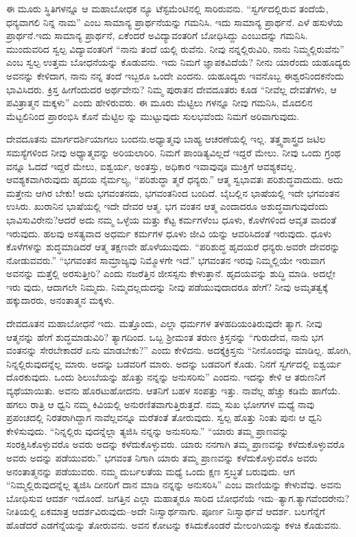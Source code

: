 ಈ ಮೂರು ಸ್ಥಿತಿಗಳನ್ನೂ ಆ ಮಹಾಬೋಧಕ ನ್ಯೂ ಟೆಸ್ಟಮೆಂಟಿನಲ್ಲಿ ಸಾರಿರುವನು. “ಸ್ವರ್ಗದಲ್ಲಿರುವ ತಂದೆಯೆ, ಧನ್ಯವಾಗಲಿ ನಿನ್ನ ನಾಮ” ಎಂಬ ಸಾಮಾನ್ಯ ಪ್ರಾರ್ಥನೆಯನ್ನು ಗಮನಿಸಿ. ಇದು ಸಾಮಾನ್ಯ ಪ್ರಾರ್ಥನೆ. ಎಳೆ ಹಸುಳೆಯ ಪ್ರಾರ್ಥನೆ.ಇದು ಸಾಮಾನ್ಯ ಪ್ರಾರ್ಥನೆ, ಏಕೆಂದರೆ ಅವಿದ್ಯಾವಂತರಿಗೆ ಬೋಧಿಸಿದ್ದು ಎಂಬುದನ್ನು ಗಮನಿಸಿ. ಮುಂದುವರಿದ ಸ್ವಲ್ಪ ವಿದ್ಯಾವಂತರಿಗೆ “ನಾನು ತಂದೆ ಯಲ್ಲಿ ರುವೆನು. ನೀವು ನನ್ನಲ್ಲಿರುವಿರಿ, ನಾನು ನಿಮ್ಮಲ್ಲಿರುವೆನು” ಎಂಬ ಸ್ವಲ್ಪ ಉತ್ತಮ ಬೋಧನೆಯನ್ನು ಕೊಡುವನು. ಇದು ನಿಮಗೆ ಜ್ಞಾಪಕವಿದೆಯೆ? ನೀನು ಯಾರೆಂದು ಯಹೂದ್ಯರು ಅವನನ್ನು ಕೇಳಿದಾಗ, ನಾನು ನನ್ನ ತಂದೆ ಇಬ್ಬರೂ ಒಂದೇ ಎಂದನು. ಯಹೂದ್ಯರು ಇವನೊಬ್ಬ ಈಶ್ವರನಿಂದಕನೆಂದು ಭಾವಿಸಿದರು. ಕ್ರಿಸ್ತ ಹೀಗೆಂದುದರ ಅರ್ಥವೇನು? ನಿಮ್ಮ ಪುರಾತನ ದೇವದೂತರು ಕೂಡ “ನೀವೆಲ್ಲ ದೇವತೆಗಳು, ಆ ಪವಿತ್ರಾತ್ಮನ ಮಕ್ಕಳು” ಎಂದು ಹೇಳಿರುವರು. ಈ ಮೂರು ಮೆಟ್ಟಿಲು ಗಳನ್ನೂ ನೀವು ಗಮನಿಸಿ, ಮೊದಲಿನ ಮೆಟ್ಟಲಿನಿಂದ ಪ್ರಾರಂಭಿಸಿ ಕೊನೆ ಮೆಟ್ಟಿಲ ನ್ನು ಮುಟ್ಟುವುದು ಸುಲಭವೆಂದು ನಿಮಗೆ ಅರಿವಾಗುವುದು.

ದೇವದೂತನು ಮಾರ್ಗದರ್ಶಿಯಾಗಲು ಬಂದನು.ಅಧ್ಯಾತ್ಮವು ಬಾಹ್ಯ ಆಚರಣೆಯಲ್ಲಿ ಇಲ್ಲ. ತತ್ತ್ವಶಾಸ್ತ್ರದ ಜಟಿಲ ಸಮಸ್ಯೆಗಳಿಂದ ನೀವು ಅಧ್ಯಾತ್ಮವನ್ನು ಅರಿಯಲಾರಿರಿ. ನಿಮಗೆ ಪಾಂಡಿತ್ಯವಿಲ್ಲದೆ ಇದ್ದರೆ ಮೇಲು. ನೀವು ಒಂದು ಗ್ರಂಥ ವನ್ನೂ ಓದದೆ ಇದ್ದರೆ ಮೇಲು, ಐಶ್ವರ್ಯ, ಅಂತಸ್ತು, ಅಧಿಕಾರ ಇವಾವುವೂ ಮುಕ್ತಿಗೆ ಆವಶ್ಯಕವಲ್ಲ. ಆವಶ್ಯಕವಾಗಿರುವುದು ಹೃದಯ ನೈರ್ಮಲ್ಯ, “ಪರಿಶುದ್ಧಾ ತ್ಮರೆ ಧನ್ಯರು.” ಆತ್ಮ ಸ್ವಭಾವತಃ ಪರಿಶುದ್ಧವಾದುದು. ಅದು ಮತ್ತೇನು ಆಗಿರ ಬೇಕು! ಅದು ಭಗವಂತನದು, ಭಗವಂತನಿಂದ ಬಂದಿದೆ. ಬೈಬಲ್ಲಿನ ಭಾಷೆಯಲ್ಲಿ ಇದೇ ಭಗವಂತನ ಉಸಿರು. ಖುರಾನಿನ ಭಾಷೆಯಲ್ಲಿ ಇದೇ ದೇವರ ಆತ್ಮ. ಭಗ ವಂತನ ಆತ್ಮ ಎಂದಾದರೂ ಅಶುದ್ಧವಾಗುವುದೆಂದು ಭಾವಿಸುವಿರೇನು?ಆದರೆ ಅದು ನಮ್ಮ ಒಳ್ಳೆಯ ಮತ್ತು ಕೆಟ್ಟ ಕರ್ಮಗಳೆಂಬ ಧೂಳು, ಕೊಳೆಗಳಿಂದ ಆವೃತ ವಾದಂತೆ ಇರುವುದು. ಹಲವು ಅಸತ್ಯವಾದ ಅಧರ್ಮ ಕರ್ಮಗಳ ಧೂಳು ಜೀವಿ ಯನ್ನು ಆವರಿಸಿದಂತೆ ಇರುವುದು. ಧೂಳು ಕೊಳೆಗಳನ್ನು ಶುದ್ಧಮಾಡಿದರೆ ಆತ್ಮ ತಕ್ಷಣವೇ ಹೊಳೆಯುವುದು. “ಪರಿಶುದ್ಧ ಹೃದಯರೆ ಧನ್ಯರು.ಅವರೇ ದೇವರನ್ನು ನೋಡುವವರು.” “ಭಗವಂತನ ಸಾಮ್ರಾಜ್ಯವು ನಿಮ್ಮೊಳಗೇ ಇದೆ.” ಭಗವಂತನ ಇರವು ನಿಮ್ಮಲ್ಲಿಯೇ ಇರುವಾಗ ಅವನನ್ನು ಮತ್ತೆಲ್ಲಿ ಅರಸುತ್ತೀರಿ? ಎಂದು ನಜರೆತ್ತಿನ ಜೀಸಸ್ಸನು ಕೇಳುತ್ತಾನೆ. ಹೃದಯವನ್ನು ಶುದ್ಧಿ ಮಾಡಿ. ಅದಲ್ಲೇ ಇರು ವುದು, ಆದಾಗಲೇ ನಿಮ್ಮದು. ನಿಮ್ಮದಲ್ಲದುದನ್ನು ನೀವು ಪಡೆಯುವುದಾದರೂ ಹೇಗೆ? ನೀವು ಅಮೃತತ್ವಕ್ಕೆ ಹಕ್ಕುದಾರರು, ಅನಂತಾತ್ಮನ ಮಕ್ಕಳು.

ದೇವದೂತನ ಮಹಾಬೋಧನೆ ಇದು. ಮತ್ತೊಂದು, ಎಲ್ಲಾ ಧರ್ಮಗಳ ತಳಹದಿಯಂತಿರುವುದೇ ತ್ಯಾಗ. ನೀವು ಆತ್ಮನನ್ನು ಹೇಗೆ ಶುದ್ಧಮಾಡುವಿರಿ? ತ್ಯಾಗದಿಂದ. ಒಬ್ಬ ಶ‍್ರೀಮಂತ ತರುಣ ಕ್ರಿಸ್ತನನ್ನು “ಗುರುದೇವ, ನಾನು ಭಗ ವಂತನನ್ನು ಸೇರಬೇಕಾದರೆ ಏನು ಮಾಡಬೇಕು?” ಎಂದು ಕೇಳಿದನು. ಅದಕ್ಕೆಕ್ರಿಸ್ತನು “ನೀನೊಂದನ್ನು ಮಾಡಿಲ್ಲ. ಹೋಗಿ, ನಿನ್ನಲ್ಲಿರುವುದನ್ನೆಲ್ಲ ಮಾರು. ಅದನ್ನು ಬಡವರಿಗೆ ಮಾರು. ಅದನ್ನು ಬಡವರಿಗೆ ಕೊಡು. ನಿನಗೆ ಸ್ವರ್ಗದಲ್ಲಿ ಐಶ್ವರ್ಯ ದೊರಕುವುದು. ಒಂದು ಶಿಲುಬೆಯನ್ನು ಹೊತ್ತು ನನ್ನನ್ನು ಅನುಸರಿಸು” ಎಂದನು. ಇದನ್ನು ಕೇಳಿ ಆ ತರುಣನಿಗೆ ವ್ಯಥೆಯಾಯಿತು. ಅವನು ಹೊರಟುಹೋದನು. ಆತನಿಗೆ ಬಹಳ ಸಂಪತ್ತು ಇತ್ತು. ನಾವೆಲ್ಲ ಹೆಚ್ಚು ಕಡಿಮೆ ಹಾಗೆಯೆ. ಹಗಲು ರಾತ್ರಿ ಆ ಧ್ವನಿ ನಮ್ಮ ಕಿವಿಯಲ್ಲಿ ಅನುರಣಿತವಾಗುತ್ತಿರುತ್ತದೆ. ನಮ್ಮ ಸುಖ ಭೋಗಗಳ ಮಧ್ಯೆ ನಾವು ಪ್ರಪಂಚದಲ್ಲಿ ನಿರತರಾಗಿದ್ದಾಗ ನಾವೆಲ್ಲವನ್ನೂ ಮರೆತಂತೆ ತೋರುವುದು. ಸ್ವಲ್ಪ ಹೊತ್ತು ನಿಂತು ಪುನಃ ಆ ಧ್ವನಿ ಕೇಳಿಸುವುದು. “ನಿನ್ನಲ್ಲಿರು ವುದನ್ನೆಲ್ಲಾ ತ್ಯಜಿಸಿ ನನ್ನನ್ನು ಅನುಸರಿಸು.” “ಯಾರು ತಮ್ಮ ಪ್ರಾಣವನ್ನು ಸಂರಕ್ಷಿಸಿಕೊಳ್ಳುವರೊ ಅವರು ಅದನ್ನು ಕಳೆದುಕೊಳ್ಳುವರು. ಯಾರು ನನಗಾಗಿ ತಮ್ಮ ಪ್ರಾಣವನ್ನು ಕಳೆದುಕೊಳ್ಳುವರೊ ಅವರು ಅದನ್ನು ಪಡೆಯುವರು.” ಭಗವಂತ ನಿಗಾಗಿ ಯಾರು ತಮ್ಮ ಪ್ರಾಣವನ್ನು ಕಳೆದುಕೊಳ್ಳುವರೊ ಅವರು ಅನಂತಾತ್ಮನನ್ನು ಪಡೆಯುವರು. ನಮ್ಮ ದುರ್ಬಲತೆಯ ಮಧ್ಯೆ ಒಂದು ಕ್ಷಣ ಸ್ತಬ್ಧತೆ ಬರುವುದು. ಆಗ “ನಿಮ್ಮಲ್ಲಿರುವುದನ್ನೆಲ್ಲ ತ್ಯಜಿಸಿ ದೀನರಿಗೆ ದಾನ ಮಾಡಿ ನನ್ನನ್ನು ಅನುಸರಿಸಿ” ಎಂಬ ವಾಣಿಯನ್ನು ಕೇಳುವೆವು. ಅವನು ಬೋಧಿಸುವ ಆದರ್ಶ ಇದೊಂದೆ. ಜಗತ್ತಿನ ಎಲ್ಲಾ ಮಹಾತ್ಮರೂ ಸಾರಿದ ಬೋಧನೆಯೆ ಇದು–ತ್ಯಾಗ.ತ್ಯಾಗವೆಂದರೇನು? ನೀತಿಯಲ್ಲಿ ಏಕಮಾತ್ರ ಆದರ್ಶವಿರುವುದು–ಅದೇ ನಿಃಸ್ವಾರ್ಥನಾಗು. ಪೂರ್ಣ ನಿಃಸ್ವಾರ್ಥವೆ ಆದರ್ಶ. ಬಲಗೆನ್ನೆಗೆ ಹೊಡೆದರೆ ಎಡಗೆನ್ನೆಯನ್ನು ತೋರುವನು. ಅವನ ಕೋಟನ್ನು ಕಸಿದುಕೊಂಡರೆ ಮೇಲಂಗಿಯನ್ನು ಕಳಚಿ ಕೊಡುವನು.

